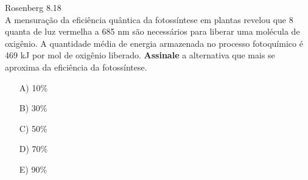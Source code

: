 \begin{problem}[answer=B]
    Rosenberg 8.18\\
    A mensuração da eficiência quântica da fotossíntese em plantas revelou que 8 quanta de luz vermelha a 685 nm são necessários para liberar uma molécula de oxigênio. A quantidade média de energia armazenada no processo fotoquímico é 469 kJ por mol de oxigênio liberado.
    \textbf{Assinale} a alternativa que mais se aproxima da eficiência da fotossíntese.
    \begin{itemize}
        \item [A)] 10\%
        \item [B)] 30\%
        \item [C)] 50\%
        \item [D)] 70\% 
        \item [E)] 90\%
    \end{itemize}
\end{problem}